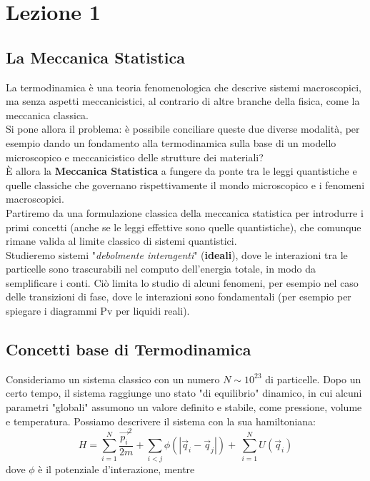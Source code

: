 \documentclass[../MeccanicaStatistica.tex]{subfiles}
\begin{document}
\section{Lezione 1}
\subsection{La Meccanica Statistica}
La termodinamica è una teoria fenomenologica che descrive sistemi macroscopici, ma senza aspetti meccanicistici, al contrario di altre branche della fisica, come la meccanica classica.\\ Si pone allora il problema: è possibile conciliare queste due diverse modalità, per esempio dando un fondamento alla termodinamica sulla base di un modello microscopico e meccanicistico delle strutture dei materiali?\\
È allora la \textbf{Meccanica Statistica} a fungere da ponte tra le leggi quantistiche e quelle classiche che governano rispettivamente il mondo microscopico e i fenomeni macroscopici.\\
Partiremo da una formulazione classica della meccanica statistica per introdurre i primi concetti (anche se le leggi effettive sono quelle quantistiche), che comunque rimane valida al limite classico di sistemi quantistici.\\
Studieremo sistemi "\textit{debolmente interagenti}" (\textbf{ideali}), dove le interazioni tra le particelle sono trascurabili nel computo dell'energia totale, in modo da semplificare i conti. Ciò limita lo studio di alcuni fenomeni, per esempio nel caso delle transizioni di fase, dove le interazioni sono fondamentali (per esempio per spiegare i diagrammi Pv per liquidi reali).

\subsection{Concetti base di Termodinamica}
Consideriamo un sistema classico con un numero $N\sim{10}^{23}$ di particelle. Dopo un certo tempo, il sistema raggiunge uno stato "di equilibrio" dinamico, in cui alcuni parametri "globali" assumono un valore definito e stabile, come pressione, volume e temperatura.
Possiamo descrivere il sistema con la sua hamiltoniana: 
\[H=\sum_{i=1}^{N}\frac{{\vec{p_i}}^2}{2m}+\sum_{i<j}{\phi\left(\left|{\vec{q}}_i-{\vec{q}}_j\right|\right)+\ \sum_{i=1}^{N}{U({\vec{q}}_i)}}\]
dove $\phi$ è il potenziale d'interazione, mentre
\end{document}
